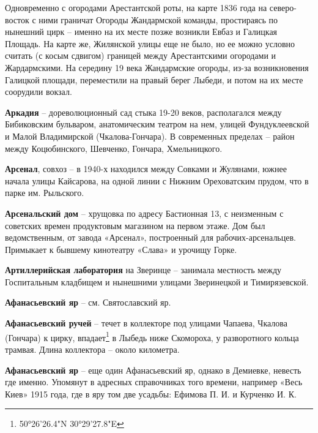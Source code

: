 Одновременно с огородами Арестантской роты, на карте 1836 года на северо-восток с ними граничат Огороды Жандармской команды, простираясь по нынешний цирк – именно на их месте позже возникли Евбаз и Галицкая Площадь. На карте же, Жилянской улицы еще не было, но ее можно условно считать (с косым сдвигом) границей между Арестантскими огородами и Жардармскими. На середину 19 века Жандармские огороды, из-за возникновения Галицкой площади, переместили на правый берег Лыбеди, и потом на их месте соорудили вокзал.\\

\medskip


\textbf{Аркадия} – дореволюционный сад стыка 19-20 веков, располагался между Бибиковским бульваром, анатомическим театром на нем, улицей Фундуклеевской и Малой Владимирской (Чкалова-Гончара). В современных пределах – район между Коцюбинского, Шевченко, Гончара, Хмельницкого.\\ 

\medskip


\textbf{Арсенал}, совхоз – в 1940-х находился между Совками и Жулянами, южнее начала улицы Кайсарова, на одной линии с Нижним Ореховатским прудом, что в парке им. Рыльского.\\

\medskip


\textbf{Арсенальский дом} – хрущовка по адресу Бастионная 13, с неизменным с советских времен продуктовым магазином на первом этаже. Дом был ведомственным, от завода «Арсенал», построенный для рабочих-арсенальцев. Примыкает к бывшему кинотеатру «Слава» и урочищу Горке.\\

\medskip


\textbf{Артиллерийская лаборатория} на Зверинце – занимала местность между Госпитальным кладбищем и нынешними улицами Зверинецкой и Тимирязевской.\\

\medskip


\textbf{Афанасьевский яр} – см. Святославский яр.\\

\medskip


\textbf{Афанасьевский ручей} – течет в коллекторе под улицами Чапаева, Чкалова (Гончара) к цирку, впадает\footnote{50°26'26.4"N 30°29'27.8"E} в Лыбедь ниже Скомороха, у разворотного кольца трамвая. Длина коллектора – около километра.\\

\medskip


\textbf{Афанасьевский яр} – еще один Афанасьевский яр, однако в Демиевке, невесть где именно. Упомянут в адресных справочниках того времени, например «Весь Киев» 1915 года, где в яру том две усадьбы: Ефимова П. И. и Курченко И. К.
